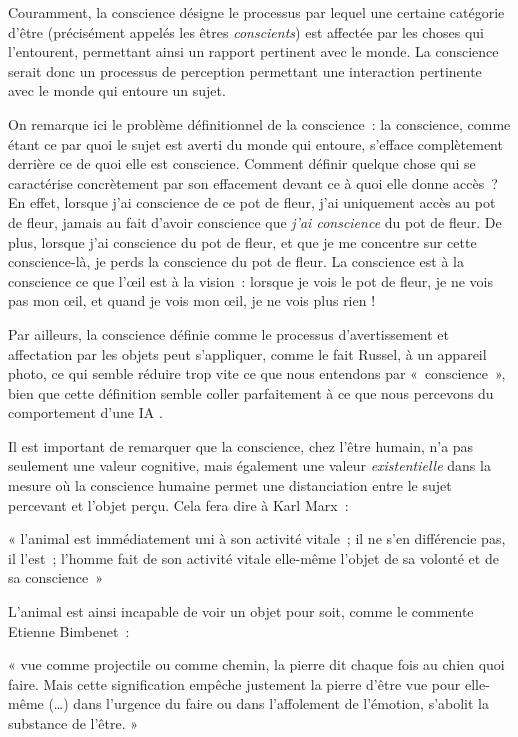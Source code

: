 \documentclass[a4paper, titlepage, 12pt]{article}
\newenvironment{longquote}%
{\vspace{-9pt}\begin{center}\begin{minipage}{120mm}\singlespacing\footnotesize «}%
{»\end{minipage}\end{center}\vspace{9pt}}
\begin{document}
	Couramment, la conscience désigne le processus par lequel une certaine catégorie d’être (précisément appelés les êtres \textit{conscients}) est affectée par les choses qui l’entourent, permettant ainsi un rapport pertinent avec le monde. La conscience serait donc un processus de perception permettant une interaction pertinente avec le monde qui entoure un sujet.

	On remarque ici le problème définitionnel de la conscience~: la conscience, comme étant ce par quoi le sujet est averti du monde qui entoure, s’efface complètement derrière ce de quoi elle est conscience. Comment définir quelque chose qui se caractérise concrètement par son effacement devant ce à quoi elle donne accès~? En effet, lorsque j’ai conscience de ce pot de fleur, j’ai uniquement accès au pot de fleur, jamais au fait d’avoir conscience que \textit{j’ai conscience} du pot de fleur. De plus, lorsque j’ai conscience du pot de fleur, et que je me concentre sur cette conscience-là, je perds la conscience du pot de fleur. La conscience est à la conscience ce que l’œil est à la vision~: lorsque je vois le pot de fleur, je ne vois pas mon œil, et quand je vois mon œil, je ne vois plus rien !

	Par ailleurs, la conscience définie comme le processus d’avertissement et affectation par les objets peut s’appliquer, comme le fait Russel, à un appareil photo, ce qui semble réduire trop vite ce que nous entendons par «~conscience~», bien que cette définition semble coller parfaitement à ce que nous percevons du comportement d’une IA \cite{russelProblemesPhilosophiee1989}.

	Il est important de remarquer que la conscience, chez l’être humain, n'a pas seulement une valeur cognitive, mais également une valeur \textit{existentielle} dans la mesure où la conscience humaine permet une distanciation entre le sujet percevant et l’objet perçu. Cela fera dire à Karl Marx~: \cite{marxManuscrits18442021}
	\begin{longquote}
	l’animal est immédiatement uni à son activité vitale~; il ne s’en différencie pas, il l’est~; l’homme fait de son activité vitale elle-même l’objet de sa volonté et de sa conscience~\end{longquote}

	L’animal est ainsi incapable de voir un objet pour soit, comme le commente Etienne Bimbenet~: \cite{bibenetLinventionRealisme2015}
	\begin{longquote}
		vue comme projectile ou comme chemin, la pierre dit chaque fois au chien quoi faire. Mais cette signification empêche justement la pierre d’être vue pour elle-même (…) dans l’urgence du faire ou dans l’affolement de l’émotion, s’abolit la substance de l’être.
	\end{longquote}
\end{document}
